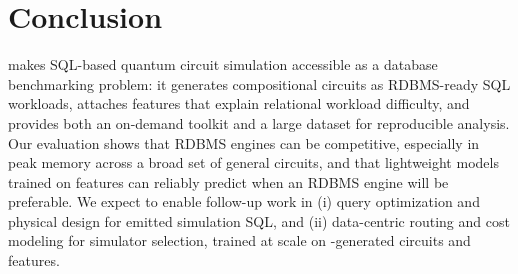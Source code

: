 \section{Conclusion}
\sys makes SQL-based quantum circuit simulation accessible as a database benchmarking problem: it generates compositional circuits as RDBMS-ready SQL workloads, attaches features that explain relational workload difficulty, and provides both an on-demand toolkit and a large dataset for reproducible analysis. Our evaluation shows that RDBMS engines can be competitive, especially in peak memory across a broad set of general circuits, and that lightweight models trained on \sys features can reliably predict when an RDBMS engine will be preferable. We expect \sys to enable follow-up work in (i) query optimization and physical design for emitted simulation SQL, and (ii) data-centric routing and cost modeling for simulator selection, trained at scale on \sys-generated circuits and features. 

{} 

 
